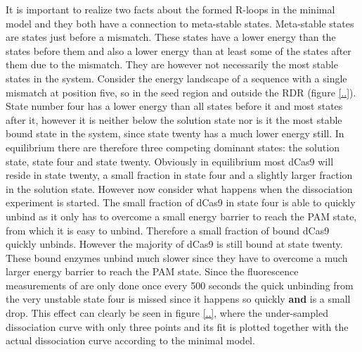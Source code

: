 It is important to realize two facts about the formed R-loops in the minimal model and they both have a connection to meta-stable states. Meta-stable states are states just before a mismatch. These states have a lower energy than the states before them and also a lower energy than at least some of the states after them due to the mismatch. They are however not necessarily the most stable states in the system. Consider the energy landscape of a sequence with a single mismatch at position five, so in the seed region and outside the RDR (figure \ref{..}). State number four has a lower energy than all states before it and most states after it, however it is neither below the solution state nor is it the most stable bound state in the system, since state twenty has a much lower energy still. In equilibrium there are therefore three competing dominant states: the solution state, state four and state twenty. Obviously in equilibrium most dCas9 will reside in state twenty, a small fraction in state four and a slightly larger fraction in the solution state. However now consider what happens when the dissociation experiment is started. The small fraction of dCas9 in state four is able to quickly unbind as it only has to overcome a small energy barrier to reach the PAM state, from which it is easy to unbind. Therefore a small fraction of bound dCas9 quickly unbinds. However the majority of dCas9 is still bound at state twenty. These bound enzymes unbind much slower since they have to overcome a much larger energy barrier to reach the PAM state. Since the fluorescence measurements of \cite{PNAS} are only done once every 500 seconds the quick unbinding from the very unstable state four is missed since it happens so quickly \textbf{and} is a small drop. This effect can clearly be seen in figure \ref{..}, where the under-sampled dissociation curve with only three points and its fit is plotted together with the actual dissociation curve according to the minimal model.


